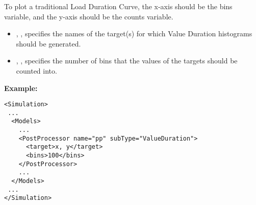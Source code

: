To plot a traditional Load Duration Curve, the x-axis should be the bins variable, and the y-axis should be
the counts variable.

%
\begin{itemize}
  \item {}, , specifies the names of the
    target(s) for which Value Duration histograms should be generated.
  \item {}, , specifies the number of bins that the values of the
    targets should be counted into.
\end{itemize}

\textbf{Example:}

\begin{lstlisting}[style=XML]
<Simulation>
 ...
  <Models>
    ...
    <PostProcessor name="pp" subType="ValueDuration">
      <target>x, y</target>
      <bins>100</bins>
    </PostProcessor>
    ...
  </Models>
 ...
</Simulation>
\end{lstlisting}
